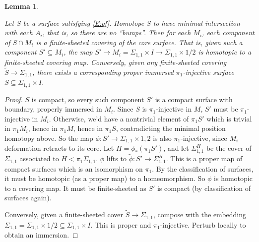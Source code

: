 \documentclass[12pt]{amsart}
\newtheorem{lemma}[theorem]{Lemma}
\theoremstyle{definition}
\theoremstyle{remark}
\newcommand{\x}{\times}
\newcommand{\Si}{\Sigma}
\newcommand{\cin}{\subseteq}
\begin{document}

\begin{lemma}\label{L:sc}

Let $S$ be a surface satisfying \eqref{E:qf}. Homotope $S$ to have minimal
intersection with each $A_i$, that is, so there are no ``bumps''.  Then for
each $M_i$, each component of $S \cap M_i$ is a finite-sheeted covering of the
core surface.  That is, given such a component $S' \cin M_i$, the map $S' \to
M_i = \Si_{1,1}\x I \to \Si_{1,1}\x{1/2}$ is homotopic to a finite-sheeted
covering map. Conversely, given any finite-sheeted covering $\widetilde{S} \to
\Si_{1,1}$, there exists a corresponding proper immersed $\pi_1$-injective
surface $S \cin \Si_{1,1}\x I$.

\end{lemma}
\begin{proof}

$S$ is compact, so every such component $S'$ is a compact surface with
boundary, properly immersed in $M_i$. Since $S$ is $\pi_1$-injective in $M$,
$S'$ must be $\pi_1$-injective in $M_i$. Otherwise, we'd have a nontrivial
element of $\pi_1S'$ which is trivial in $\pi_1M_i$, hence in $\pi_1M$, hence
in $\pi_1S$, contradicting the minimal position homotopy above. So the map
$\phi : S'\to\Si_{1,1}\x{1,2}$ is also $\pi_1$-injective, since $M_i$
deformation retracts to its core. Let $H = \phi_*(\pi_1S')$, and let
$\Si_{1,1}^H$ be the cover of $\Si_{1,1}$ associated to $H<\pi_1\Si_{1,1}$.
$\phi$ lifts to $\widetilde{\phi}\colon S'\to \Si_{1,1}^H$. This is a proper
map of compact surfaces which is an isomorphism on $\pi_1$.  By the
classification of surfaces, it must be homotopic (as a proper map) to
a homeomorphism. So $\phi$ is homotopic to a covering map. It must be
finite-sheeted as $S'$ is compact (by classification of surfaces again).

Conversely, given a finite-sheeted cover $\widetilde{S}\to \Si_{1,1}$, compose
with the embedding $\Si_{1,1} = \Si_{1,1}\x{1/2} \cin \Si_{1,1}\x I$. This is
proper and $\pi_1$-injective.  Perturb locally to obtain an immersion.

\end{proof}
\end{document}
